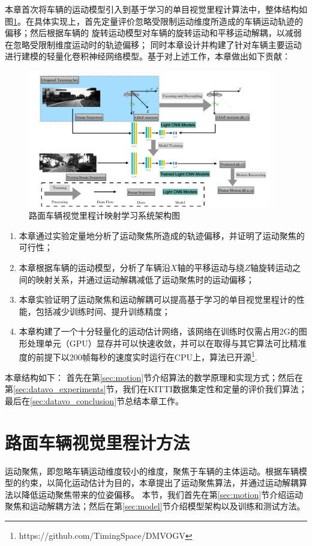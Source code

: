 本章首次将车辆的运动模型引入到基于学习的单目视觉里程计算法中，整体结构如图\ref{fig:datavo_system_structure}。在具体实现上，首先定量评价忽略受限制运动维度所造成的车辆运动轨迹的偏移；然后根据车辆的
旋转运动模型对车辆的旋转运动和平移运动解耦，以减弱在忽略受限制维度运动时的轨迹偏移；
同时本章设计并构建了针对车辆主要运动进行建模的轻量化卷积神经网络模型。基于对上述工作，本章做出如下贡献：
\begin{figure}[h]
    \centering
    \includegraphics[width=0.95\textwidth]{datavo/system_structure.pdf}
    \caption{路面车辆视觉里程计映射学习系统架构图}
    \label{fig:datavo_system_structure}
\end{figure}
\begin{enumerate}
    \item 本章通过实验定量地分析了运动聚焦所造成的轨迹偏移，并证明了运动聚焦的可行性；
    \item 本章根据车辆的运动模型，分析了车辆沿$X$轴的平移运动与绕$Z$轴旋转运动之间的映射关系，并通过运动解耦减低了运动聚焦时的运动偏移；
    \item 本章实验证明了运动聚焦和运动解耦可以提高基于学习的单目视觉里程计的性能，包括减少训练时间、提升训练精度；
    \item 本章构建了一个十分轻量化的运动估计网络，该网络在训练时仅需占用2G的图形处理单元（GPU）显存并可以快速收敛，并可以在取得与其它算法可比精准度的前提下以200帧每秒的速度实时运行在CPU上，算法已开源\footnote{https://github.com/TimingSpace/DMVOGV}.
\end{enumerate}

本章结构如下：
首先在第\ref{sec:motion}节介绍算法的数学原理和实现方式；然后在第\ref{sec:datavo_experiments}节，我们在KITTI数据集\cite{geiger2012kitti}定性和定量的评价我们算法；
最后在\ref{sec:datavo_conclusion}节总结本章工作。

\section{路面车辆视觉里程计方法}
运动聚焦，即忽略车辆运动维度较小的维度，聚焦于车辆的主体运动。根据车辆模型的约束，以简化运动估计为目的，本章提出了运动聚焦算法，并通过运动解耦算法以降低运动聚焦带来的位姿偏移。
本节，我们首先在第\ref{sec:motion}节介绍运动聚焦和运动解耦方法；然后在第\ref{sec:model}节介绍模型架构以及训练和测试方法。

